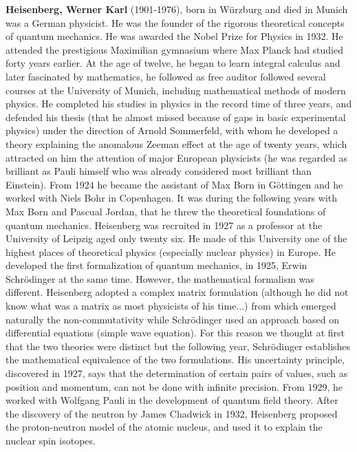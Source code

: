\textbf{Heisenberg, Werner Karl} (1901-1976), born in Würzburg and died in Munich was a German physicist. He was the founder of the rigorous theoretical concepts of quantum mechanics. He was awarded the Nobel Prize for Physics in 1932. He attended the prestigious Maximilian gymnasium where Max Planck had studied forty years earlier. At the age of twelve, he began to learn integral calculus and later fascinated by mathematics, he followed as free auditor followed several courses at the University of Munich, including mathematical methods of modern physics. He completed his studies in physics in the record time of three years, and defended his thesis (that he almost missed because of gaps in basic experimental physics) under the direction of Arnold Sommerfeld, with whom he developed a theory explaining the anomalous Zeeman effect at the age of twenty years, which attracted on him the attention of major European physicists (he was regarded as brilliant as Pauli himself who was already considered most brilliant than Einstein). From 1924 he became the assistant of Max Born in Göttingen and he worked with Niels Bohr in Copenhagen. It was during the following years with Max Born and Pascual Jordan, that he threw the theoretical foundations of quantum mechanics. Heisenberg was recruited in 1927 as a professor at the University of Leipzig aged only twenty six. He made of this University one of the highest places of theoretical physics (especially nuclear physics) in Europe. He developed the first formalization of quantum mechanics, in 1925, Erwin Schrödinger at the same time. However, the mathematical formalism was different. Heisenberg adopted a complex matrix formulation (although he did not know what was a matrix as most physicists of his time...) from which emerged naturally the non-commutativity while Schrödinger used an approach based on differential equations (simple wave equation). For this reason we thought at first that the two theories were distinct but the following year, Schrödinger establishes the mathematical equivalence of the two formulations. His uncertainty principle, discovered in 1927, says that the determination of certain pairs of values, such as position and momentum, can not be done with infinite precision. From 1929, he worked with Wolfgang Pauli in the development of quantum field theory. After the discovery of the neutron by James Chadwick in 1932, Heisenberg proposed the proton-neutron model of the atomic nucleus, and used it to explain the nuclear spin isotopes.

